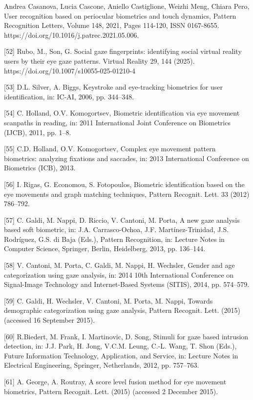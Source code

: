 \documentclass{article}
\begin{document}
\begin{raggedright}
[51] Andrea Casanova, Lucia Cascone, Aniello Castiglione, Weizhi Meng, Chiara Pero, User recognition based on periocular biometrics and touch dynamics, Pattern Recognition Letters, Volume 148, 2021, Pages 114-120, ISSN 0167-8655. https://doi.org/10.1016/j.patrec.2021.05.006.

[52] Rubo, M., Son, G. Social gaze fingerprints: identifying social virtual reality users by their eye gaze patterns. Virtual Reality 29, 144 (2025). https://doi.org/10.1007/s10055-025-01210-4

[53] D.L. Silver, A. Biggs, Keystroke and eye-tracking biometrics for user identification, in: IC-AI, 2006, pp. 344–348.

[54] C. Holland, O.V. Komogortsev, Biometric identification via eye movement scanpaths in reading, in: 2011 International Joint Conference on Biometrics (IJCB), 2011, pp. 1–8.

[55] C.D. Holland, O.V. Komogortsev, Complex eye movement pattern biometrics: analyzing fixations and saccades, in: 2013 International Conference on Biometrics (ICB), 2013.

[56] I. Rigas, G. Economou, S. Fotopoulos, Biometric identification based on the eye movements and graph matching techniques, Pattern Recognit. Lett. 33 (2012) 786–792.

[57] C. Galdi, M. Nappi, D. Riccio, V. Cantoni, M. Porta, A new gaze analysis based soft biometric, in: J.A. Carrasco-Ochoa, J.F. Martínez-Trinidad, J.S. Rodríguez, G.S. di Baja (Eds.), Pattern Recognition, in: Lecture Notes in Computer Science, Springer, Berlin, Heidelberg, 2013, pp. 136–144.

[58] V. Cantoni, M. Porta, C. Galdi, M. Nappi, H. Wechsler, Gender and age categorization using gaze analysis, in: 2014 10th International Conference on Signal-Image Technology and Internet-Based Systems (SITIS), 2014, pp. 574–579.

[59] C. Galdi, H. Wechsler, V. Cantoni, M. Porta, M. Nappi, Towards demographic categorization using gaze analysis, Pattern Recognit. Lett. (2015) (accessed 16 September 2015).

[60] R.Biedert, M. Frank, I. Martinovic, D. Song, Stimuli for gaze based intrusion detection, in: J.J. Park, H. Jong, V.C.M. Leung, C.-L. Wang, T. Shon (Eds.), Future Information Technology, Application, and Service, in: Lecture Notes in Electrical Engineering, Springer, Netherlands, 2012, pp. 757–763.

[61] A. George, A. Routray, A score level fusion method for eye movement biometrics, Pattern Recognit. Lett. (2015) (accessed 2 December 2015).


\end{raggedright}
\end{document}

